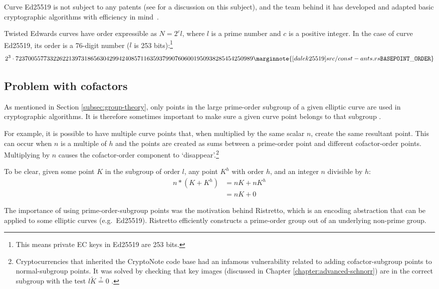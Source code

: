 Curve Ed25519 is not subject to any patents (see \cite{ECC-patents} for a discussion on this subject), and the team behind it has
developed and adapted basic cryptographic algorithms with efficiency in mind~\cite{Bernstein2007-faster-ec-ops}.

Twisted Edwards curves have order expressible as \(N=2^c l\), where \(l\) is a prime number and \(c\) is a positive integer. In the case of curve Ed25519, its order is a 76-digit number ($l$ is 253 bits):\footnote{This means private EC keys in Ed25519 are 253 bits.}\vspace{.175cm}
\[2^3 \cdot 7237005577332262213973186563042994240857116359379907606001950938285454250989\marginnote{[dalek25519] src/const- ants.rs {\tt BASEPOINT\_ ORDER}}\]


\subsection{Problem with cofactors}
\label{subsec:problem-cofactors}

As mentioned in Section \ref{subsec:group-theory}, only points in the large prime-order subgroup of a given elliptic curve are used in cryptographic algorithms. It is therefore sometimes important to make sure a given curve point belongs to that subgroup \cite{decaf}.

For example, it is possible to have multiple curve points that, when multiplied by the same scalar $n$, create the same resultant point. This can occur when $n$ is a multiple of $h$ and the points are created as sums between a prime-order point and different cofactor-order points. Multiplying by $n$ causes the cofactor-order component to `disappear'.\footnote{Cryptocurrencies that inherited the CryptoNote code base had an infamous vulnerability related to adding cofactor-subgroup points to normal-subgroup points. It was solved by checking that key images (discussed in Chapter \ref{chapter:advanced-schnorr}) are in the correct subgroup with the test $l \tilde{K} \stackrel{?}{=} 0$ \cite{key-image-bug}.}

To be clear, given some point $K$ in the subgroup of order $l$, any point $K^h$ with order $h$, and an integer $n$ divisible by $h$:
\begin{align*}
    n*(K + K^h) &= n K + n K^h\\
                &= n K + 0
\end{align*}

The importance of using prime-order-subgroup points was the motivation behind Ristretto, which is an encoding abstraction that can be applied to some elliptic curves (e.g.\ Ed25519). Ristretto efficiently constructs a prime-order group out of an underlying non-prime group. \cite{ristretto-motivation}


